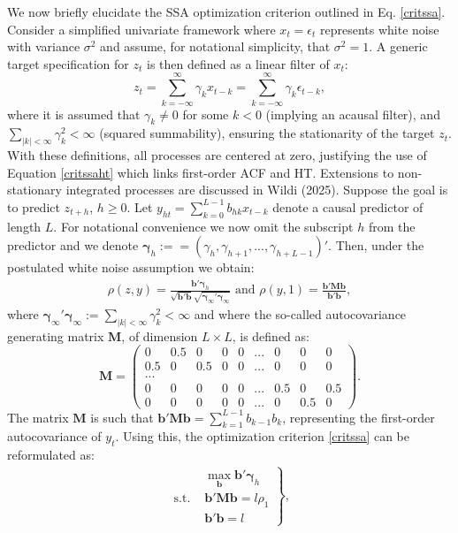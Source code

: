 \documentclass[11pt,a4paper]{article}
\begin{document}
We now briefly elucidate the SSA optimization criterion outlined in Eq. \eqref{critssa}. Consider a simplified univariate framework where $x_t=\epsilon_t$ represents white noise with variance $\sigma^2$ and assume, for notational simplicity, that $\sigma^2=1$. A generic target specification for $z_t$ is then defined as a linear filter of $x_t$:
\[z_t=\sum_{k=-\infty}^\infty \gamma_k x_{t-k}=\sum_{k=-\infty}^\infty \gamma_k \epsilon_{t-k},\] 
where it is assumed that $\gamma_k\neq 0$ for some $k<0$ (implying an acausal filter), and $\sum_{|k|<\infty}\gamma_k^2<\infty$ (squared summability), ensuring the stationarity of the target $z_t$. With these definitions, all processes are centered at zero, justifying the use of Equation \eqref{critssaht} which links first-order ACF and HT. Extensions to non-stationary integrated processes are discussed in Wildi (2025). Suppose the goal is to predict  $z_{t+h}$, $h\geq 0$. Let  $y_{h t}=\sum_{k=0}^{L-1} b_{h k}x_{t-k}$  denote a causal predictor of length $L$. For notational convenience we now omit the subscript $h$ from the predictor and we denote $\boldsymbol{\gamma}_h:==(\gamma_{h},\gamma_{h+1},...,\gamma_{h+L-1})'$. %
Then, under the postulated white noise assumption we obtain:
\begin{eqnarray*}
\rho(z,y)=\frac{\mathbf{b}'\boldsymbol{\gamma}_h}{\sqrt{\mathbf{b}'\mathbf{b}}\sqrt{\boldsymbol{\gamma}_{\infty}'\boldsymbol{\gamma}_{\infty}}} \textrm{~and~}\rho(y,1)=\frac{\mathbf{b}'\mathbf{Mb}}{\mathbf{b}'\mathbf{b}},
\end{eqnarray*} 
where $\boldsymbol{\gamma}_{\infty}'\boldsymbol{\gamma}_{\infty}:=\sum_{|k|<\infty}\gamma_k^2<\infty$ and where the so-called autocovariance generating matrix $\mathbf{M}$, of dimension $L\times L$, is defined as:
\[
\mathbf{M}=\left(\begin{array}{ccccccccc}0&0.5&0&0&0&...&0&0&0\\
0.5&0&0.5&0&0&...&0&0&0\\
...&&&&&&&&\\
0&0&0&0&0&...&0.5&0&0.5\\
0&0&0&0&0&...&0&0.5&0
\end{array}\right).
\]
The matrix $\mathbf{M}$ is such that $\mathbf{b}'\mathbf{Mb}=\sum_{k=1}^{L-1}b_{k-1}b_k$, representing the first-order autocovariance of $y_t$.  Using this, the optimization criterion \eqref{critssa} can be reformulated as:
\begin{eqnarray}\label{crit1}
\left.\begin{array}{cc}
&\max_{\mathbf{b}}\mathbf{b}'\boldsymbol{\gamma}_{h}\\
\textrm{s.t.~}&\mathbf{b}'\mathbf{Mb}=l\rho_1\\
&\mathbf{b}'\mathbf{b}=l
\end{array}\right\},
\end{eqnarray}
\end{document}
